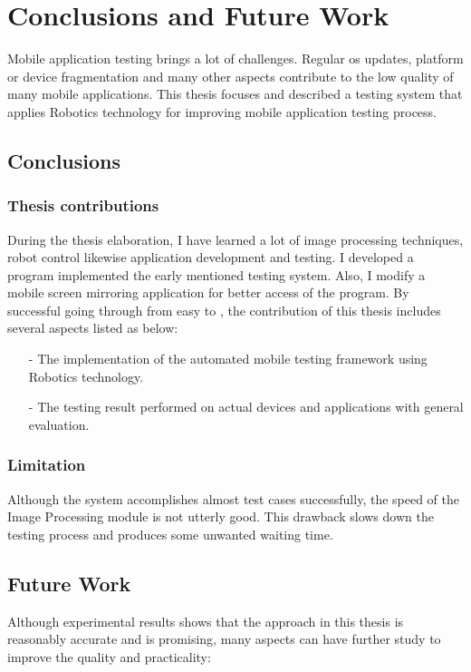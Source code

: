 \chapter{Conclusions and Future Work}
Mobile application testing brings a lot of challenges. Regular \acrshort{os} updates, platform or device fragmentation and many other aspects contribute to the low quality of many mobile applications. This thesis focuses and described a testing system that applies Robotics technology for improving mobile application testing process.

\section{Conclusions}
\subsection{Thesis contributions}
During the thesis elaboration, I have learned a lot of image processing techniques, robot control likewise application development and testing.
I developed a program implemented the early mentioned testing system. Also, I modify a mobile screen mirroring application for better access of the program.
\newline
By successful going through from easy to , the contribution of this thesis includes several aspects listed as below:
	
    \begin{itemize}
		\item[-] The implementation of the automated mobile testing framework using Robotics technology.
		\item[-] The testing result performed on actual devices and applications with general evaluation.
	\end{itemize}

\subsection{Limitation}
Although the system accomplishes almost test cases successfully, the speed of the Image Processing module is not utterly good. This drawback slows down the testing process and produces some unwanted waiting time.

\section{Future Work}
Although experimental results shows that the approach in this thesis is reasonably accurate and is promising, many aspects can have further study to improve the quality and practicality:

